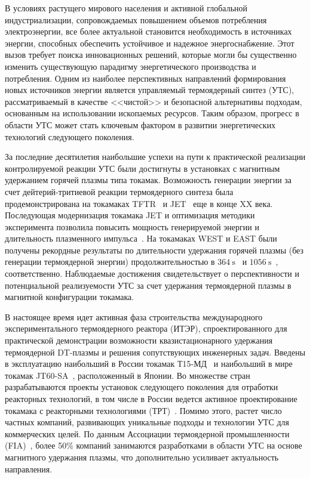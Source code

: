 
{\actuality} В условиях растущего мирового населения и активной глобальной индустриализации, сопровождаемых повышением объемов потребления электроэнергии,
все более актуальной становится необходимость в источниках энергии, способных обеспечить устойчивое и надежное энергоснабжение. Этот вызов требует поиска инновационных решений, которые могли бы существенно изменить существующую парадигму энергетического производства и потребления. Одним из наиболее перспективных направлений формирования новых источников энергии является управляемый термоядерный синтез (УТС), рассматриваемый в качестве <<чистой>> и безопасной альтернативы подходам, основанным на использовании ископаемых ресурсов. Таким образом, прогресс в области УТС может стать ключевым фактором в развитии энергетических технологий следующего поколения.

За последние десятилетия наибольшие успехи на пути к практической реализации контролируемой реакции УТС были достигнуты в установках с магнитным удержанием горячей плазмы типа токамак. Возможность генерации энергии за счет дейтерий-тритиевой реакции термоядерного синтеза была продемонстрирована на токамаках TFTR~\cite{Skinner1997} и JET~\cite{Keilhacker1999} еще в конце XX века. Последующая модернизация токамака JET и оптимизация методики эксперимента позволила повысить мощность генерируемой энергии и длительность плазменного импульса~\cite{Maggi2024,Kappatou2025}. На токамаках WEST и EAST были получены рекордные результаты по длительности удержания горячей плазмы (без генерации термоядерной энергии) продолжительностью в \(\SI{364}{\second}\)~\cite{Shi2025} и \(\SI{1056}{\second}\)~\cite{Song2024}, соответственно. Наблюдаемые достижения свидетельствует о перспективности и потенциальной реализуемости УТС за счет удержания термоядерной плазмы в магнитной конфигурации токамака.

В настоящее время идет активная фаза строительства международного экспериментального термоядерного реактора (ИТЭР), спроектированного для практической демонстрации возможности квазистационарного удержания термоядерной DT-плазмы и решения сопутствующих инженерных задач. Введены в эксплуатацию наибольший в России токамак Т15-МД~\cite{Velikhov2024} и наибольший в мире токамак JT60-SA~\cite{Shirai2024}, расположенный в Японии. Во множестве стран разрабатываются проекты установок следующего поколения для отработки реакторных технологий, в том числе в России ведется активное проектирование токамака с реакторными технологиями (ТРТ)~\cite{Krasilnikov2021}. Помимо этого, растет число частных компаний, развивающих уникальные подходы и технологии УТС для коммерческих целей. По данным Ассоциации термоядерной промышленности (FIA)~\cite{FIA}, более 50\% компаний занимаются разработками в области УТС на основе магнитного удержания плазмы, что дополнительно усиливает актуальность направления.

